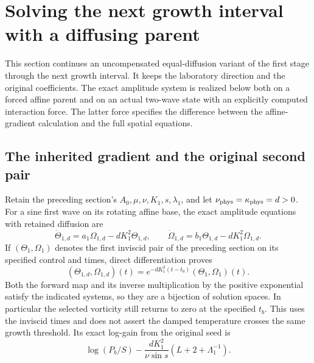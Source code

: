 \section{Solving the next growth interval with a diffusing parent}
\label{cvlane:sec:cv-diffusive-parent}

This section continues an uncompensated equal-diffusion variant of the
first stage through the next growth interval. It keeps the laboratory
direction and the original coefficients. The exact amplitude system
is realized below both on a forced affine parent and on an actual
two-wave state with an explicitly computed interaction force.
The latter force specifies the difference between the affine-gradient
calculation and the full spatial equations.

\subsection{The inherited gradient and the original second pair}

Retain the preceding section's $A_0,\mu,\nu,K_1,s,\lambda_1$, and
let $\nu_{\rm phys}=\kappa_{\rm phys}=d>0$.
For a sine first wave on its rotating affine base, the exact amplitude
equations with retained diffusion are
\[
 \dot\Theta_{1,d}=a_1\Omega_{1,d}-dK_1^2\Theta_{1,d},\qquad
 \dot\Omega_{1,d}=b_1\Theta_{1,d}-dK_1^2\Omega_{1,d}.
\]
If $(\Theta_1,\Omega_1)$ denotes the first inviscid pair of the
preceding section on its specified control and times, direct
differentiation proves
\[
 (\Theta_{1,d},\Omega_{1,d})(t)
 =e^{-dK_1^2(t-t_0)}(\Theta_1,\Omega_1)(t).
\]
Both the forward map and its inverse multiplication by the positive
exponential satisfy the indicated systems, so they are a bijection
of solution spaces. In particular the selected vorticity still returns
to zero at the specified $t_b$. This uses the inviscid times and does
not assert the damped temperature crosses the same growth threshold.
Its exact log-gain from the original seed is
\[
 \log(P_b/S)-\frac{dK_1^2}{\nu\sin s}
                       (L+2+\Lambda_1^{-1}).
\]

